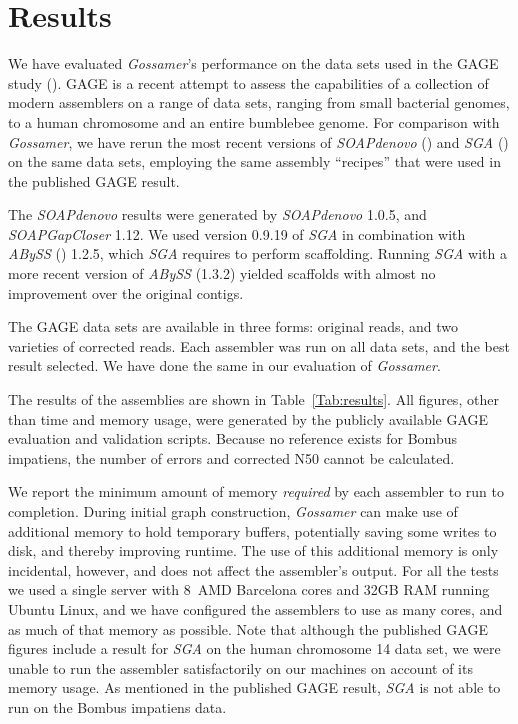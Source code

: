 \documentclass{bioinfo}
\newcommand{\Gossamer}{\textit{Gossamer}}
\newcommand{\SOAPdenovo}{\textit{SOAPdenovo}}
\newcommand{\ABySS}{\textit{ABySS}}
\newcommand{\SOAPGapCloser}{\textit{SOAPGapCloser}}
\newcommand{\SGA}{\textit{SGA}}
\begin{document}
\vspace{-1.5em}
\section{Results}
\label{Sec:results}

We have evaluated \Gossamer{}'s performance on the data sets used in the GAGE study (\cite{Salzberg:2011}). 
GAGE is a recent attempt to assess the capabilities of a collection of modern assemblers on 
a range of data sets, ranging from small bacterial genomes, to a human chromosome and an entire bumblebee genome.
For comparison with \Gossamer{}, we have rerun the most recent versions of \SOAPdenovo{} (\cite{li2010novo}) and \SGA{} (\cite{Simpson:2012ef}) on the same data sets, employing the same assembly ``recipes'' that were used in the published GAGE result. 

The \SOAPdenovo{} results were generated by \SOAPdenovo{} 1.0.5, and \SOAPGapCloser{} 1.12. 
We used version 0.9.19 of \SGA{} in combination with \ABySS{} (\cite{Simpson:2009iv}) 1.2.5, which \SGA{} requires to perform scaffolding. Running \SGA{} with a more recent version of \ABySS{} (1.3.2) yielded scaffolds with almost no improvement over the original contigs. 

The GAGE data sets are available in three forms: original reads, and two varieties of corrected reads.
Each assembler was run on all data sets, and the best result selected. We have done the same in our evaluation of \Gossamer{}.

The results of the assemblies are shown in Table~\ref{Tab:results}. All figures, other than time and memory usage, were generated by the publicly available GAGE evaluation and validation scripts.
Because no reference exists for Bombus impatiens, the number of errors and corrected N50 cannot be calculated.

We report the minimum amount of memory \emph{required} by each assembler to run to completion.
During initial graph construction, \Gossamer{} can make use of additional 
memory to hold temporary buffers, potentially saving some writes to disk, and thereby improving runtime.
The use of this additional memory is only incidental, however, and does not affect the assembler's output.
For all the tests we used a single server with 8~AMD Barcelona
cores and 32GB RAM running Ubuntu Linux, and we have configured the assemblers to use as many cores, and as much of that memory as possible.
Note that although the published GAGE figures include a result for \SGA{} on the human chromosome 14 data set, we were unable to run the assembler satisfactorily on our machines on account of its memory usage. As mentioned in the published GAGE result, \SGA{} is not able to run on the Bombus impatiens data.
\end{document}
